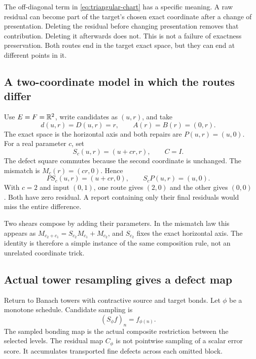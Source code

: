 The off-diagonal term in \eqref{eq:triangular-chart} has a specific meaning. A raw residual can become part of the target's chosen exact coordinate after a change of presentation. Deleting the residual before changing presentation removes that contribution. Deleting it afterwards does not. This is not a failure of exactness preservation. Both routes end in the target exact space, but they can end at different points in it.

\subsection{A two-coordinate model in which the routes differ}
Use \(E=F=\mathbb R^2\), write candidates as \((u,r)\), and take
\[
 d(u,r)=D(u,r)=r,\qquad A(r)=B(r)=(0,r).
\]
The exact space is the horizontal axis and both repairs are \(P(u,r)=(u,0)\). For a real parameter \(c\), set
\[
 S_c(u,r)=(u+cr,r),\qquad C=I.
\]
The defect square commutes because the second coordinate is unchanged. The mismatch is \(M_c(r)=(cr,0)\). Hence
\[
 PS_c(u,r)=(u+cr,0),\qquad S_cP(u,r)=(u,0).
\]
With \(c=2\) and input \((0,1)\), one route gives \((2,0)\) and the other gives \((0,0)\). Both have zero residual. A report containing only their final residuals would miss the entire difference.


Two shears compose by adding their parameters. In the mismatch law this appears as \(M_{c_2+c_1}=S_{c_2}M_{c_1}+M_{c_2}\), and \(S_{c_2}\) fixes the exact horizontal axis. The identity is therefore a simple instance of the same composition rule, not an unrelated coordinate trick.

\subsection{Actual tower resampling gives a defect map}
Return to Banach towers with contractive source and target bonds. Let \(\phi\) be a monotone schedule. Candidate sampling is
\[
 (S_\phi f)_n=f_{\phi(n)}.
\]
The sampled bonding map is the actual composite restriction between the selected levels. The residual map \(C_\phi\) is not pointwise sampling of a scalar error score. It accumulates transported fine defects across each omitted block.

